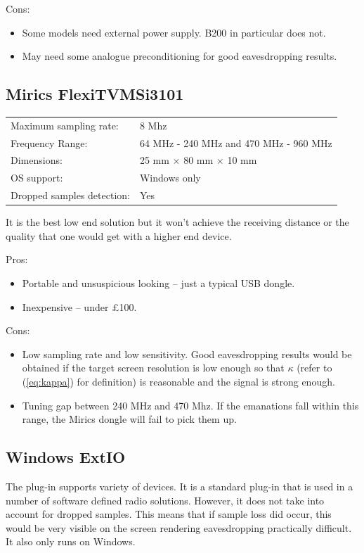 \documentclass[a4paper,12pt,twoside,openright]{report}
\begin{document}
Cons:
\begin{itemize}
	\item Some models need external power supply. B200 in particular does not.
	\item May need some analogue preconditioning for good eavesdropping results.
\end{itemize}

\subsection{Mirics FlexiTV\texttrademark MSi3101}

\begin{tabular}{ll}
	Maximum sampling rate: & 8 Mhz \\
	Frequency Range: & 64 MHz - 240 MHz and 470 MHz - 960 MHz \\
	Dimensions: & 25 mm $\times$ 80 mm $\times$ 10 mm \\
	OS support: & Windows only \\
	Dropped samples detection: & Yes
\end{tabular}

It is the best low end solution but it won't achieve the receiving distance or the quality that one would get with a higher end device.

Pros:
\begin{itemize}
	\item Portable and unsuspicious looking -- just a typical USB dongle.
	\item Inexpensive -- under \pounds 100.
\end{itemize}

Cons:
\begin{itemize}
	\item Low sampling rate and low sensitivity. Good eavesdropping results would be obtained if the target screen resolution is low enough so that $\kappa$ (refer to (\ref{eq:kappa}) for definition) is reasonable and the signal is strong enough.
	\item Tuning gap between 240 MHz and 470 Mhz. If the emanations fall within this range, the Mirics dongle will fail to pick them up.
\end{itemize}

\subsection{Windows ExtIO}

The plug-in supports variety of devices. It is a standard plug-in that is used in a number of software defined radio solutions. However, it does not take into account for dropped samples. This means that if sample loss did occur, this would be very visible on the screen rendering eavesdropping practically difficult. It also only runs on Windows.
\end{document}
